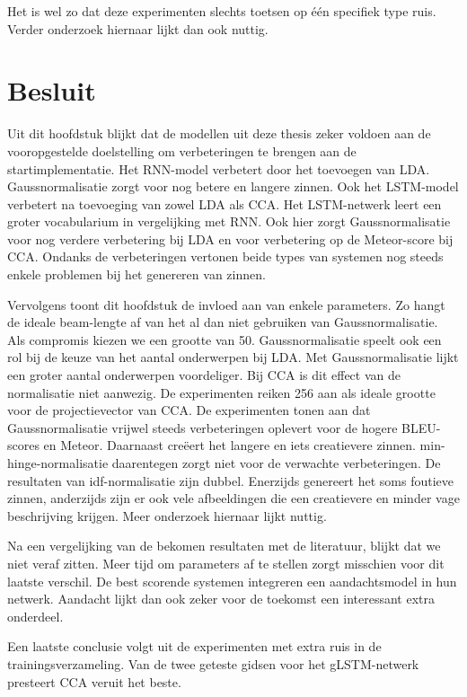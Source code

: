 Het is wel zo dat deze experimenten slechts toetsen op \'e\'en specifiek type ruis. Verder onderzoek hiernaar lijkt dan ook nuttig.

\section{Besluit} %
\label{sec:besluit}
Uit dit hoofdstuk blijkt dat de modellen uit deze thesis zeker voldoen aan de vooropgestelde doelstelling om verbeteringen te brengen aan de startimplementatie. Het RNN-model verbetert door het toevoegen van LDA. Gaussnormalisatie zorgt voor nog betere en langere zinnen.
Ook het LSTM-model verbetert na toevoeging van zowel LDA als CCA. Het LSTM-netwerk leert een groter vocabularium in vergelijking met RNN. Ook hier zorgt Gaussnormalisatie voor nog verdere verbetering bij LDA en voor verbetering op de Meteor-score bij CCA.
Ondanks de verbeteringen vertonen beide types van systemen nog steeds enkele problemen bij het genereren van zinnen.

Vervolgens toont dit hoofdstuk de invloed aan van enkele parameters. Zo hangt de ideale beam-lengte af van het al dan niet gebruiken van Gaussnormalisatie. Als compromis kiezen we een grootte van 50.
Gaussnormalisatie speelt ook een rol bij de keuze van het aantal onderwerpen bij LDA. Met Gaussnormalisatie lijkt een groter aantal onderwerpen voordeliger.
Bij CCA is dit effect van de normalisatie niet aanwezig. De experimenten reiken 256 aan als ideale grootte voor de projectievector van CCA.
De experimenten tonen aan dat Gaussnormalisatie vrijwel steeds verbeteringen oplevert voor de hogere BLEU-scores en Meteor. Daarnaast cre\"eert het langere en iets creatievere zinnen. min-hinge-normalisatie daarentegen zorgt niet voor de verwachte verbeteringen.
De resultaten van idf-normalisatie zijn dubbel. Enerzijds genereert het soms foutieve zinnen, anderzijds zijn er ook vele afbeeldingen die een creatievere en minder vage beschrijving krijgen. Meer onderzoek hiernaar lijkt nuttig.

Na een vergelijking van de bekomen resultaten met de literatuur, blijkt dat we niet veraf zitten. Meer tijd om parameters af te stellen zorgt misschien voor dit laatste verschil. De best scorende systemen integreren een aandachtsmodel in hun netwerk. Aandacht lijkt dan ook zeker voor de toekomst een interessant extra onderdeel.

Een laatste conclusie volgt uit de experimenten met extra ruis in de trainingsverzameling. Van de twee geteste gidsen voor het gLSTM-netwerk presteert CCA veruit het beste.


